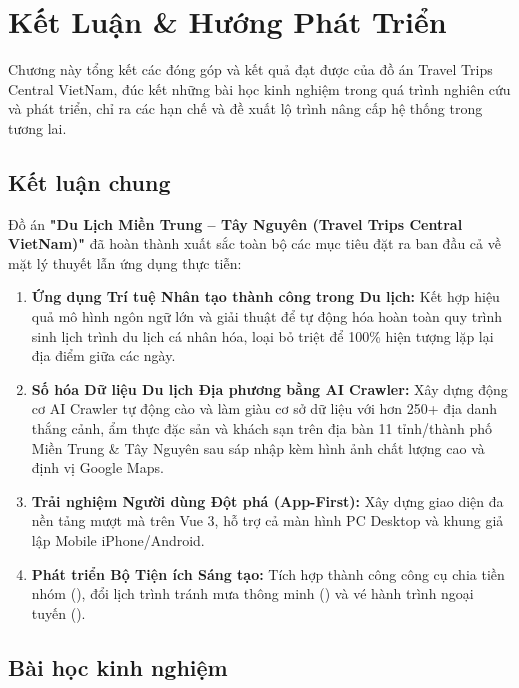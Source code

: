\chapter{Kết Luận \& Hướng Phát Triển}

\begin{muctieu}
Chương này tổng kết các đóng góp và kết quả đạt được của đồ án Travel Trips Central VietNam, đúc kết những bài học kinh nghiệm trong quá trình nghiên cứu và phát triển, chỉ ra các hạn chế và đề xuất lộ trình nâng cấp hệ thống trong tương lai.
\end{muctieu}

\section{Kết luận chung}

Đồ án \textbf{"Du Lịch Miền Trung -- Tây Nguyên (Travel Trips Central VietNam)"} đã hoàn thành xuất sắc toàn bộ các mục tiêu đặt ra ban đầu cả về mặt lý thuyết lẫn ứng dụng thực tiễn:

\begin{enumerate}
    \item \textbf{Ứng dụng Trí tuệ Nhân tạo thành công trong Du lịch:} Kết hợp hiệu quả mô hình ngôn ngữ lớn  và giải thuật  để tự động hóa hoàn toàn quy trình sinh lịch trình du lịch cá nhân hóa, loại bỏ triệt để 100\% hiện tượng lặp lại địa điểm giữa các ngày.
    \item \textbf{Số hóa Dữ liệu Du lịch Địa phương bằng AI Crawler:} Xây dựng động cơ AI Crawler tự động cào và làm giàu cơ sở dữ liệu với hơn 250+ địa danh thắng cảnh, ẩm thực đặc sản và khách sạn trên địa bàn 11 tỉnh/thành phố Miền Trung \& Tây Nguyên sau sáp nhập kèm hình ảnh chất lượng cao và định vị Google Maps.
    \item \textbf{Trải nghiệm Người dùng Đột phá (App-First):} Xây dựng giao diện đa nền tảng mượt mà trên Vue 3, hỗ trợ cả màn hình PC Desktop và khung giả lập Mobile iPhone/Android.
    \item \textbf{Phát triển Bộ Tiện ích Sáng tạo:} Tích hợp thành công công cụ chia tiền nhóm (), đổi lịch trình tránh mưa thông minh () và vé hành trình ngoại tuyến ().
\end{enumerate}

\section{Bài học kinh nghiệm}

